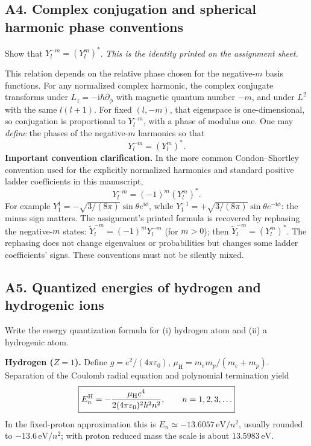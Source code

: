 \documentclass[11pt,a4paper]{article}
\newcommand{\iu}{\mathrm{i}}
\newcommand{\mH}{\mu_{\mathrm H}}
\newcommand{\eps}{\varepsilon_0}
\begin{document}
\subsection{A4. Complex conjugation and spherical harmonic phase conventions}
\begin{questionbox}Show that \(Y_l^{-m}=(Y_l^m)^*\). \emph{This is the identity printed on the assignment sheet.}\end{questionbox}
This relation depends on the relative phase chosen for the negative-\(m\) basis functions. For any normalized complex harmonic, the complex conjugate transforms under \(L_z=-\iu\hbar\partial_\phi\) with magnetic quantum number \(-m\), and under \(L^2\) with the same \(l(l+1)\). For fixed \((l,-m)\), that eigenspace is one-dimensional, so conjugation is proportional to \(Y_l^{-m}\), with a phase of modulus one. One may \emph{define} the phases of the negative-\(m\) harmonics so that
\begin{equation}\boxed{Y_l^{-m}=(Y_l^m)^*.}\end{equation}
\textbf{Important convention clarification.} In the more common Condon--Shortley convention used for the explicitly normalized harmonics and standard positive ladder coefficients in this manuscript,
\begin{equation}\boxed{Y_l^{-m}=(-1)^m(Y_l^m)^*.}\end{equation}
For example \(Y_1^1=-\sqrt{3/(8\pi)}\sin\theta e^{\iu\phi}\), while \(Y_1^{-1}=+\sqrt{3/(8\pi)}\sin\theta e^{-\iu\phi}\): the minus sign matters. The assignment's printed formula is recovered by rephasing the negative-\(m\) states: \(\widetilde Y_l^{-m}=(-1)^mY_l^{-m}\) (for \(m>0\)); then \(\widetilde Y_l^{-m}=(Y_l^m)^*\). The rephasing does not change eigenvalues or probabilities but changes some ladder coefficients' signs. These conventions must not be silently mixed.

\subsection{A5. Quantized energies of hydrogen and hydrogenic ions}
\begin{questionbox}Write the energy quantization formula for (i) hydrogen atom and (ii) a hydrogenic atom.\end{questionbox}
\textbf{Hydrogen (\(Z=1\)).} Define \(g=e^2/(4\pi\eps)\), \(\mH=m_em_p/(m_e+m_p)\). Separation of the Coulomb radial equation and polynomial termination yield
\begin{equation}\boxed{E_n^{\rm H}=-\frac{\mH e^4}{2(4\pi\eps)^2\hbar^2n^2},\qquad n=1,2,3,\ldots}\end{equation}
In the fixed-proton approximation this is \(E_n\simeq-13.6057\,\mathrm{eV}/n^2\), usually rounded to \(-13.6\,\mathrm{eV}/n^2\); with proton reduced mass the scale is about \(13.5983\,\mathrm{eV}\).
\end{document}

